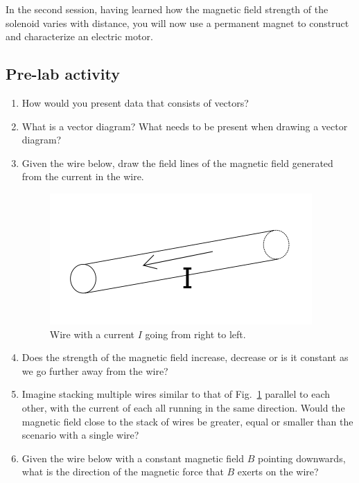 \documentclass[12pt]{report}
\begin{document}
In the second session, having learned how the magnetic field strength of the solenoid varies with distance, you will now use a permanent magnet to construct and characterize an electric motor.

\subsection{Pre-lab activity}
\begin{enumerate}
\item How would you present data that consists of vectors?

\item What is a vector diagram? What needs to be present when drawing a vector diagram?

\item Given the wire below, draw the field lines of the magnetic field generated from the current in the wire.

\begin{figure}[h]
\centering
\includegraphics[scale=0.5]{lab3-wire}
\caption{Wire with a current $I$ going from right to left.}
\label{Fig:lab3-prelab-wire}
\end{figure}

\item Does the strength of the magnetic field increase, decrease or is it constant as we go further away from the wire?

\item Imagine stacking multiple wires similar to that of Fig.~\ref{Fig:lab3-prelab-wire} parallel to each other, with the current of each all running in the same direction. Would the magnetic field close to the stack of wires  be greater, equal or smaller than the scenario with a single wire?

\item Given the wire below with a constant magnetic field $B$ pointing downwards, what is the direction of the magnetic force that $B$ exerts on the wire?


\end{enumerate}
\end{document}
